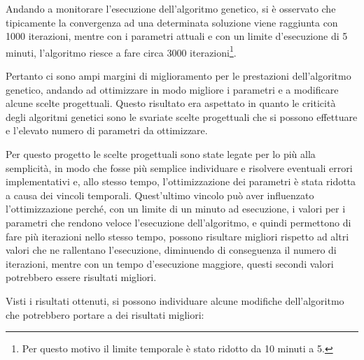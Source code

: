 Andando a monitorare l'esecuzione dell'algoritmo genetico, si è osservato che tipicamente la convergenza ad una determinata soluzione viene raggiunta con 1000 iterazioni, mentre con i parametri attuali e con un limite d'esecuzione di 5 minuti, l'algoritmo riesce a fare circa 3000 iterazioni\footnote{Per questo motivo il limite temporale è stato ridotto da 10 minuti a 5.}.

Pertanto ci sono ampi margini di miglioramento per le prestazioni dell'algoritmo genetico, andando ad ottimizzare in modo migliore i parametri e a modificare alcune scelte progettuali.
Questo risultato era aspettato in quanto le criticità degli algoritmi genetici sono le svariate scelte progettuali che si possono effettuare e l'elevato numero di parametri da ottimizzare.

Per questo progetto le scelte progettuali sono state legate per lo più alla semplicità, in modo che fosse più semplice individuare e risolvere eventuali errori implementativi e, allo stesso tempo, l'ottimizzazione dei parametri è stata ridotta a causa dei vincoli temporali. 
Quest'ultimo vincolo può aver influenzato l'ottimizzazione perché, con un limite di un minuto ad esecuzione, i valori per i parametri che rendono veloce l'esecuzione dell'algoritmo, e quindi permettono di fare più iterazioni nello stesso tempo, possono risultare migliori rispetto ad altri valori che ne rallentano l'esecuzione, diminuendo di conseguenza il numero di iterazioni, mentre con un tempo d'esecuzione maggiore, questi secondi valori potrebbero essere risultati migliori.

Visti i risultati ottenuti, si possono individuare alcune modifiche dell'algoritmo che potrebbero portare a dei risultati migliori:

